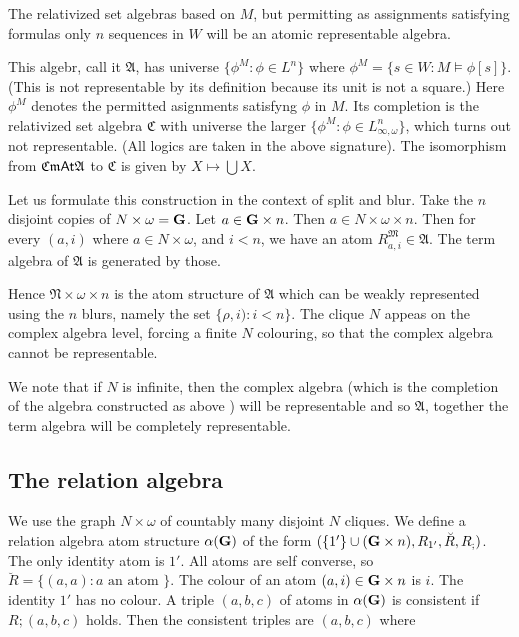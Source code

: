 \documentclass[12pt]{article}
\theoremstyle{definition}
\def\C{{\mathfrak{C}}}
\def\A{{\mathfrak{A}}}
\def\C{{\mathfrak{C}}}
\def\M{{\mathfrak{M}}}
\def\N{{\mathfrak{N}}}
\def\G{{\sf G}}
\def\Cm{{\mathfrak{Cm}}}
\def\A{{\mathfrak{A}}}
\def\C{{\mathfrak{C}}}
\def\A{{\mathfrak{A}}}
\def\C{{\mathfrak{C}}}
\def\G{{\bf G}}
\def\At{{\sf At}}
\begin{document}
The relativized set algebras based on $M$, but permitting as assignments satisfying formulas only $n$ sequences in $W$ will be an atomic
representable algebra.

This algebr, call it $\A$, has universe $\{\phi^M: \phi\in L^n\}$ where $\phi^M=\{s\in W: M\models \phi[s]\}.$ (This is not representable by its definition
because its unit is not a square.) Here $\phi^M$ denotes the permitted asignments satisfyng $\phi$ in $M$.
Its completion is the relativized set algebra $\C$ with universe the larger $\{\phi^M: \phi\in L^n_{\infty,\omega}\}$,
which turns out not representable. (All logics are taken in the above signature).
The isomorphism from  $\Cm\At\A$ to $\C$ is given by $X\mapsto \bigcup X$.

Let us formulate this construction in the context of split and blur.
Take the $n$ disjoint copies of $N\times \omega=\G$.
Let $a\in \G\times n$. Then $a\in N\times \omega\times n$. 
Then for every $(a,i)$ where $a\in N\times \omega$, and $i<n$, we have an atom $R_{a,i}^{\M}\in \A$. 
The term algebra of $\A$ is generated by those. 

Hence $\N\times \omega\times n$ is the atom structure of $\A$ which can be weakly represented using the $n$ blurs, namely the set
$\{\rho, i): i<n\}$. 
The clique  $N$ appeas on the complex algebra level, forcing a finite $N$ colouring, 
so that the complex algebra cannot be representable.


We note that if $N$ is infinite, then the complex algebra (which is the completion of the algebra constructed
as above ) will be representable and so $\A$, together the term algebra will be  completely 
representable.

\subsection{The relation algebra}

We use the graph $N\times \omega$ of countably many disjoint $N$ cliques.
We define a relation algebra atom structure $\alpha(\G)$ of the form
$(\{1'\}\cup (\G\times n), R_{1'}, \breve{R}, R_;)$.
The only identity atom is $1'$. All atoms are self converse, 
so $\breve{R}=\{(a, a): a \text { an atom }\}.$
The colour of an atom $(a,i)\in \G\times n$ is $i$. The identity $1'$ has no colour. A triple $(a,b,c)$ 
of atoms in $\alpha(\G)$ is consistent if
$R;(a,b,c)$ holds. Then the consistent triples are $(a,b,c)$ where
\end{document}
